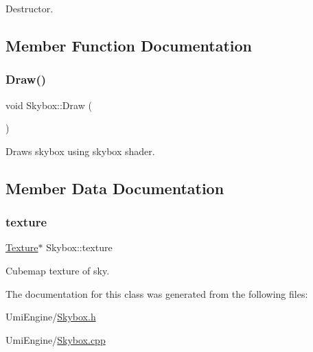 Destructor. 



\subsection{Member Function Documentation}
\mbox{\label{class_skybox_a8bf85652e4f0559530eb7a1f5ed87439}} 
\subsubsection{\texorpdfstring{Draw()}{Draw()}}
{\footnotesize\ttfamily void Skybox\+::\+Draw (\begin{DoxyParamCaption}{ }\end{DoxyParamCaption})}



Draws skybox using skybox shader. 



\subsection{Member Data Documentation}
\mbox{\label{class_skybox_a6e1ace9b3bcf2c50136a833d2a1d2118}} 
\subsubsection{\texorpdfstring{texture}{texture}}
{\footnotesize\ttfamily \mbox{\hyperlink{class_texture}{Texture}}$\ast$ Skybox\+::texture}



Cubemap texture of sky. 



The documentation for this class was generated from the following files\+:\begin{DoxyCompactItemize}
\item 
Umi\+Engine/\mbox{\hyperlink{_skybox_8h}{Skybox.\+h}}\item 
Umi\+Engine/\mbox{\hyperlink{_skybox_8cpp}{Skybox.\+cpp}}\end{DoxyCompactItemize}
